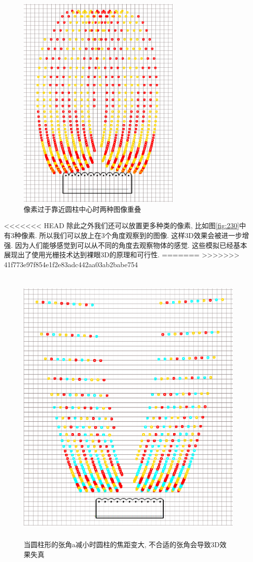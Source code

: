 \documentclass[a4paper, 11pt]{article}
\begin{document}
\begin{CJK}{UTF8}{gbsn}
\begin{figure}[h!]
  \centerline{\includegraphics[width=8cm]{229.png}}
  \caption{像素过于靠近圆柱中心时两种图像重叠}
  \label{fig:229}
\end{figure}

<<<<<<< HEAD
除此之外我们还可以放置更多种类的像素, 比如图\ref{fig:230}中有3种像素. 所以我们可以放上在3个角度观察到的图像. 这样3D效果会被进一步增强. 因为人们能够感觉到可以从不同的角度去观察物体的感觉. 这些模拟已经基本展现出了使用光栅技术达到裸眼3D的原理和可行性.
=======
>>>>>>> 41f773e97f854e1f2e83adc442aa03ab2babe754
\begin{figure}[h!]
  \centerline{\includegraphics[height=14cm]{231.png}}
  \caption{当圆柱形的张角a减小时圆柱的焦距变大, 不合适的张角会导致3D效果失真}
  \label{fig:231}
\end{figure}


\end{CJK}
\end{document}
